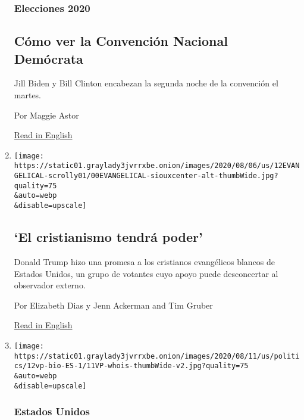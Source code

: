 \begin{enumerate}
  \hypertarget{elecciones-2020-5}{%
  \subsubsection{Elecciones 2020}\label{elecciones-2020-5}}

  \hypertarget{cuxf3mo-ver-la-convenciuxf3n-nacional-demuxf3crata}{%
  \subsection{Cómo ver la Convención Nacional
  Demócrata}\label{cuxf3mo-ver-la-convenciuxf3n-nacional-demuxf3crata}}

  Jill Biden y Bill Clinton encabezan la segunda noche de la convención
  el martes.

  Por Maggie Astor

  \href{https://www.nytimes3xbfgragh.onion/2020/08/18/us/politics/speakers-dnc-schedule.html}{Read
  in English}
\item
  \href{/es/2020/08/13/espanol/estados-unidos/trump-cristianos-evangelicos.html}{}

  \texttt{[image: https://static01.graylady3jvrrxbe.onion/images/2020/08/06/us/12EVANGELICAL-scrolly01/00EVANGELICAL-siouxcenter-alt-thumbWide.jpg?quality=75\\\&auto=webp\\\&disable=upscale]}

  \hypertarget{el-cristianismo-tendruxe1-poder}{%
  \subsection{`El cristianismo tendrá
  poder'}\label{el-cristianismo-tendruxe1-poder}}

  Donald Trump hizo una promesa a los cristianos evangélicos blancos de
  Estados Unidos, un grupo de votantes cuyo apoyo puede desconcertar al
  observador externo.

  Por Elizabeth Dias y Jenn Ackerman and Tim Gruber

  \href{https://www.nytimes3xbfgragh.onion/2020/08/09/us/evangelicals-trump-christianity.html}{Read
  in English}
\item
  \href{/es/2020/08/12/espanol/estados-unidos/quien-es-kamala-harris-vicepresidenta.html}{}

  \texttt{[image: https://static01.graylady3jvrrxbe.onion/images/2020/08/11/us/politics/12vp-bio-ES-1/11VP-whois-thumbWide-v2.jpg?quality=75\\\&auto=webp\\\&disable=upscale]}

  \hypertarget{estados-unidos-1}{%
  \subsubsection{Estados Unidos}\label{estados-unidos-1}}


\end{enumerate}
